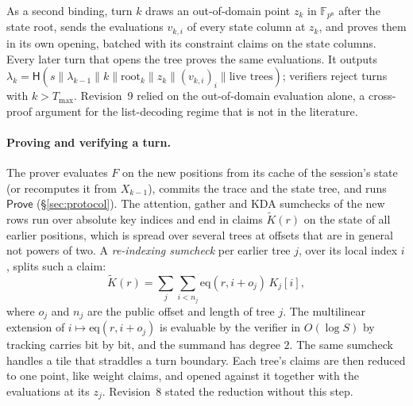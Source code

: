 \documentclass[11pt]{article}
\newcommand{\F}{\mathbb{F}}
\newcommand{\Fo}{\F_{p^8}}
\begin{document}
As a second binding, turn \(k\) draws an out-of-domain point \(z_k\) in \(\Fo\) after the state root, sends the evaluations \(v_{k,i}\) of every state column at \(z_k\), and proves them in its own opening, batched with its constraint claims on the state columns.
Every later turn that opens the tree proves the same evaluations.
It outputs \(\lambda_k = \mathsf{H}(s \| \lambda_{k-1} \| k \| \mathrm{root}_k \| z_k \| (v_{k,i})_i \| \text{live trees})\); verifiers reject turns with \(k > T_{\max}\).
Revision~9 relied on the out-of-domain evaluation alone, a cross-proof argument for the list-decoding regime that is not in the literature.

\paragraph{Proving and verifying a turn.}
The prover evaluates \(F\) on the new positions from its cache of the session's state (or recomputes it from \(X_{k-1}\)), commits the trace and the state tree, and runs \(\mathsf{Prove}\) (\S\ref{sec:protocol}).
The attention, gather and KDA sumchecks of the new rows run over absolute key indices and end in claims \(\tilde K(r)\) on the state of all earlier positions, which is spread over several trees at offsets that are in general not powers of two.
A \emph{re-indexing sumcheck} per earlier tree \(j\), over its local index \(i\), splits such a claim:
\[
\textstyle \tilde K(r) = \sum_j \sum_{i < n_j} \mathrm{eq}(r, i + o_j)\, K_j[i],
\]
where \(o_j\) and \(n_j\) are the public offset and length of tree \(j\).
The multilinear extension of \(i \mapsto \mathrm{eq}(r, i + o_j)\) is evaluable by the verifier in \(O(\log S)\) by tracking carries bit by bit, and the summand has degree \(2\).
The same sumcheck handles a tile that straddles a turn boundary.
Each tree's claims are then reduced to one point, like weight claims, and opened against it together with the evaluations at its \(z_j\).
Revision~8 stated the reduction without this step.
\end{document}
